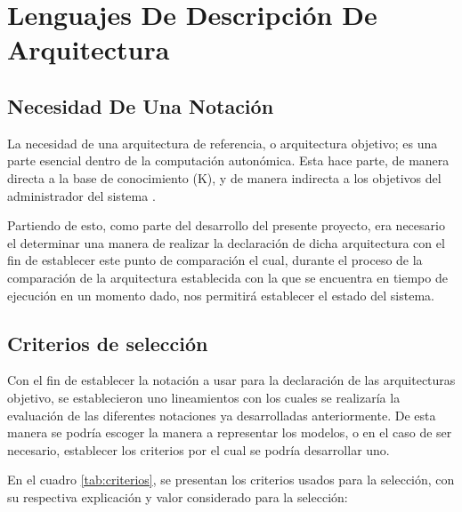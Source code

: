 \chapter{Lenguajes De Descripción De Arquitectura}

\section{Necesidad De Una Notación}

La necesidad de una arquitectura de referencia, o arquitectura objetivo; es una parte esencial dentro de la computación autonómica. Esta hace parte, de manera directa a la base de conocimiento (K), y de manera indirecta a los objetivos del administrador del sistema \cite[p. 24]{lalanda_diaconescu_mccann_2014}. 

Partiendo de esto, como parte del desarrollo del presente proyecto, era necesario el determinar una manera de realizar la declaración de dicha arquitectura con el fin de establecer este punto de comparación el cual, durante el proceso de la comparación de la arquitectura establecida con la que se encuentra en tiempo de ejecución en un momento dado, nos permitirá establecer el estado del sistema.

\section{Criterios de selección}

Con el fin de establecer la notación a usar para la declaración de las arquitecturas objetivo, se establecieron uno lineamientos con los cuales se realizaría la evaluación de las diferentes notaciones ya desarrolladas anteriormente. De esta manera se podría escoger la manera a representar los modelos, o en el caso de ser necesario, establecer los criterios por el cual se podría desarrollar uno.

En el cuadro \ref{tab:criterios}, se presentan los criterios usados para la selección, con su respectiva explicación y valor considerado para la selección:


